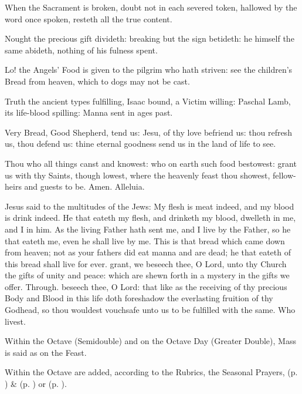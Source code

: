 When the Sacrament is broken, doubt not in each severed token, hallowed by the word once spoken, resteth all the true content.\par
Nought the precious gift divideth: breaking but the sign betideth: he himself the same abideth, nothing of his fulness spent.\par
Lo! the Angels' Food is given to the pilgrim who hath striven: see the children's Bread from heaven, which to dogs may not be cast.\par
Truth the ancient types fulfilling, Isaac bound, a Victim willing: Paschal Lamb, its life-blood spilling: Manna sent in ages past.\par
Very Bread, Good Shepherd, tend us: Jesu, of thy love befriend us: thou refresh us, thou defend us: thine eternal goodness send us in the land of life to see.\par
Thou who all things canst and knowest: who on earth such food bestowest: grant us with thy Saints, though lowest, where the heavenly feast thou showest, fellow-heirs and guests to be. Amen. Alleluia.

 Jesus said to the multitudes of the Jews: My flesh is meat indeed, and my blood is drink indeed. He that eateth my flesh, and drinketh my blood, dwelleth in me, and I in him. As the living Father hath sent me, and I live by the Father, so he that eateth me, even he shall live by me. This is that bread which came down from heaven; not as your fathers did eat manna and are dead; he that eateth of this bread shall live for ever.
\secret
{} grant, we beseech thee, O Lord, unto thy Church the gifts of unity and peace: which are shewn forth in a mystery in the gifts we offer. Through.
\postcommunion
{} beseech thee, O Lord: that like as the receiving of thy precious Body and Blood in this life doth foreshadow the everlasting fruition of thy Godhead, so thou wouldest vouchsafe unto us to be fulfilled with the same. Who livest.
\begin{rubric}
    Within the Octave (Semidouble) and on the Octave Day (Greater Double), Mass is said as on the Feast.
\end{rubric}
\begin{rubric}
    Within the Octave are added, according to the Rubrics, the Seasonal Prayers,   (p. \pageref{SPMaryInEaster}) \&   (p. \pageref{SPAgainst}) or  (p. \pageref{SPChiefBishop}).
\end{rubric}



